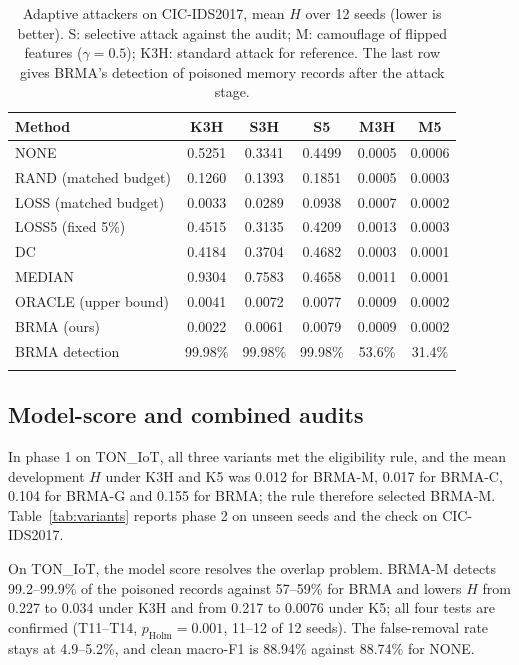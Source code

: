 \documentclass[pdflatex,sn-mathphys-num]{sn-jnl}
\theoremstyle{thmstyleone}
\theoremstyle{thmstylethree}
\begin{document}
\begin{table}[htbp]
\caption{Adaptive attackers on CIC-IDS2017, mean $H$ over 12 seeds (lower is better). S: selective attack against the audit; M: camouflage of flipped features ($\gamma=0.5$); K3H: standard attack for reference. The last row gives BRMA's detection of poisoned memory records after the attack stage.}\label{tab:adaptive}
\footnotesize
\begin{tabularx}{\textwidth}{@{}lCCCCC@{}}
\toprule
Method & K3H & S3H & S5 & M3H & M5\\
\midrule
NONE & 0.5251 & 0.3341 & 0.4499 & 0.0005 & 0.0006\\
RAND (matched budget) & 0.1260 & 0.1393 & 0.1851 & 0.0005 & 0.0003\\
LOSS (matched budget) & 0.0033 & 0.0289 & 0.0938 & 0.0007 & 0.0002\\
LOSS5 (fixed 5\%) & 0.4515 & 0.3135 & 0.4209 & 0.0013 & 0.0003\\
DC & 0.4184 & 0.3704 & 0.4682 & 0.0003 & 0.0001\\
MEDIAN & 0.9304 & 0.7583 & 0.4658 & 0.0011 & 0.0001\\
ORACLE (upper bound) & 0.0041 & 0.0072 & 0.0077 & 0.0009 & 0.0002\\
BRMA (ours) & 0.0022 & 0.0061 & 0.0079 & 0.0009 & 0.0002\\
\midrule
BRMA detection & 99.98\% & 99.98\% & 99.98\% & 53.6\% & 31.4\%\\
\botrule
\end{tabularx}
\end{table}

\subsection{Model-score and combined audits}\label{sec:variantres}
In phase 1 on TON\_IoT, all three variants met the eligibility rule, and the mean development $H$ under K3H and K5 was 0.012 for BRMA-M, 0.017 for BRMA-C, 0.104 for BRMA-G and 0.155 for BRMA; the rule therefore selected BRMA-M. Table~\ref{tab:variants} reports phase 2 on unseen seeds and the check on CIC-IDS2017.

On TON\_IoT, the model score resolves the overlap problem. BRMA-M detects 99.2--99.9\% of the poisoned records against 57--59\% for BRMA and lowers $H$ from 0.227 to 0.034 under K3H and from 0.217 to 0.0076 under K5; all four tests are confirmed (T11--T14, $p_{\mathrm{Holm}}=0.001$, 11--12 of 12 seeds). The false-removal rate stays at 4.9--5.2\%, and clean macro-F1 is 88.94\% against 88.74\% for NONE.
\end{document}
